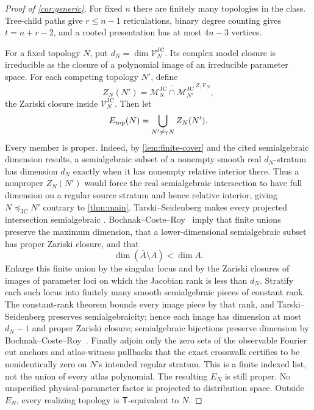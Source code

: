 \documentclass[11pt]{article}
\theoremstyle{remark}
\newcommand{\M}{\mathcal M}
\newcommand{\V}{\mathcal V}
\newcommand{\JC}{\mathrm{JC}}
\newcommand{\Tmove}{\mathsf T}
\newcommand{\preceqjc}{\preceq_{\!\JC}}
\begin{document}
\begin{proof}[Proof of \cref{cor:generic}]
For fixed $n$ there are finitely many topologies in the class.  Tree-child
paths give $r\le n-1$ reticulations, binary degree counting gives
$t=n+r-2$, and a rooted presentation has at most $4n-3$ vertices.

For a fixed topology $N$, put $d_N=\dim\V_N^{\JC}$.  Its complex model
closure is irreducible as the closure of a polynomial image of an
irreducible parameter space.  For each competing topology $N'$, define
\[
Z_N(N')=
\overline{\M_N^{\JC}\cap\M_{N'}^{\JC}}^{\,Z,\V_N},
\]
the Zariski closure inside $\V_N^{\JC}$.  Then let
\[
E_{\rm top}(N)=
\bigcup_{N'\not\sim_{\Tmove}N}
Z_N(N').
\]
Every member is proper.  Indeed, by \cref{lem:finite-cover} and the cited
semialgebraic dimension results, a semialgebraic subset of a nonempty smooth
real $d_N$-stratum has dimension $d_N$ exactly when it has nonempty relative
interior there.  Thus a nonproper $Z_N(N')$ would force the real
semialgebraic intersection to have full dimension on a regular source
stratum and hence relative interior, giving $N\preceqjc N'$ contrary to
\cref{thm:main}.
Tarski--Seidenberg makes every projected intersection semialgebraic
\cite[Theorem~2.2.1, applied iteratively]{BochnakCosteRoy1998}.
Bochnak--Coste--Roy~\cite[Propositions~2.8.2, 2.8.5(i), and
2.8.13]{BochnakCosteRoy1998} imply that finite unions preserve the maximum
dimension, that a lower-dimensional semialgebraic subset has proper Zariski
closure, and that
\[
  \dim(\overline A\setminus A)<\dim A.
\]
Enlarge this finite union by the singular locus and by the Zariski closures
of images of parameter loci on which the Jacobian rank is less than $d_N$.
Stratify each such locus into finitely many smooth semialgebraic pieces of
constant rank.  The constant-rank theorem bounds every image piece by that
rank, and Tarski--Seidenberg preserves semialgebraicity; hence each image has
dimension at most $d_N-1$ and proper Zariski closure; semialgebraic bijections
preserve dimension by
Bochnak--Coste--Roy~\cite[Theorem~2.8.8]{BochnakCosteRoy1998}.
Finally adjoin only the zero sets of the observable Fourier cut anchors and
atlas-witness pullbacks that the exact crosswalk certifies to be
nonidentically zero on $N$'s intended regular stratum.  This is a finite
indexed list, not the union of every atlas polynomial.  The resulting $E_N$
is still proper.  No unspecified physical-parameter factor is projected to
distribution space.
Outside $E_N$, every realizing topology is $\Tmove$-equivalent to $N$.
\end{proof}
\end{document}
